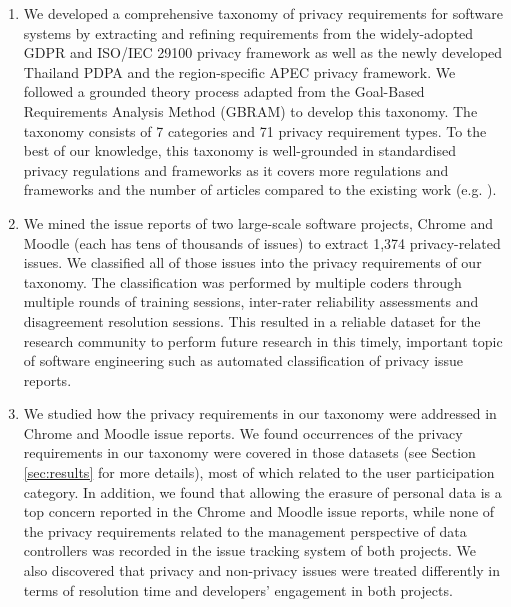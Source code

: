 \begin{enumerate}[leftmargin=0.5cm]
  \item We developed a comprehensive taxonomy of privacy requirements for software systems by extracting and refining requirements from the widely-adopted GDPR and ISO/IEC 29100 privacy framework as well as the newly developed Thailand PDPA and the region-specific APEC privacy framework. We followed a grounded theory process adapted from the Goal-Based Requirements Analysis Method (GBRAM) \cite{Antn2004} to develop this taxonomy. The taxonomy consists of 7 categories and 71 privacy requirement types. To the best of our knowledge, this taxonomy is well-grounded in standardised privacy regulations and frameworks as it covers more regulations and frameworks and the number of articles compared to the existing work (e.g. \cite{Meis}).  

  \item We mined the issue reports of two large-scale software projects, Chrome and Moodle (each has tens of thousands of issues) to extract 1,374 privacy-related issues. We classified all of those issues into the privacy requirements of our taxonomy. The classification was performed by multiple coders through multiple rounds of training sessions, inter-rater reliability assessments and disagreement resolution sessions. This resulted in a reliable dataset for the research community to perform future research in this timely, important topic of software engineering such as automated classification of privacy issue reports.

 \item We studied how the privacy requirements in our taxonomy were addressed in Chrome and Moodle issue reports. We found  occurrences of the privacy requirements in our taxonomy were covered in those datasets (see Section \ref{sec:results} for more details), most of which related to the user participation category. In addition, we found that allowing the erasure of personal data is a top concern reported in the Chrome and Moodle issue reports, while none of the privacy requirements related to the management perspective of data controllers was recorded in the issue tracking system of both projects. We also discovered that privacy and non-privacy issues were treated differently in terms of resolution time and developers' engagement in both projects.


\end{enumerate}

